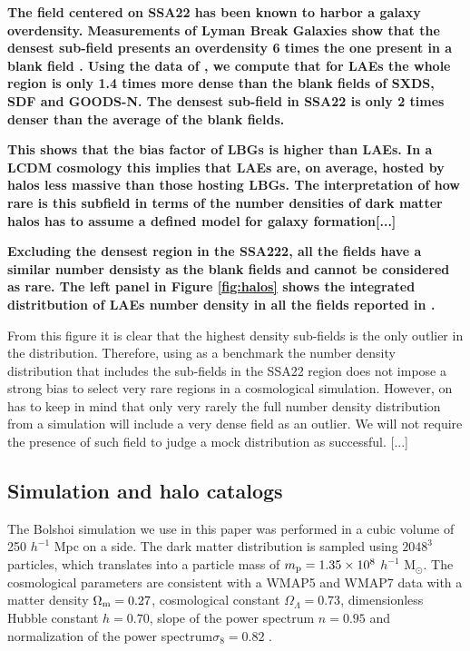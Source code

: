 \documentclass[usenatbib]{mn2e}
\begin{document}
{\bf The field centered on SSA22 has been known to harbor a 
  galaxy overdensity. Measurements of Lyman Break Galaxies show that
  the densest sub-field presents an overdensity 6 times the one present in a
  blank field \cite{XXX}. Using the data of \cite{Yamada2012}, we
  compute that for LAEs the whole region is only 1.4 times more dense than
  the blank fields of SXDS, SDF and GOODS-N. The densest sub-field
  in SSA22 is only 2 times denser than the average of the blank
  fields.}

{\bf This shows that the bias factor of LBGs is higher
  than LAEs. In a LCDM cosmology this implies that LAEs are, on average,
  hosted by halos less massive than those hosting LBGs. The
  interpretation of how rare is this subfield in terms of the number
  densities of dark matter halos has to assume a defined model for
  galaxy formation[...]} 



{\bf Excluding the densest region in the SSA222, all the fields have a
similar number densisty as the blank fields and cannot be considered
as rare. The left panel in Figure \ref{fig:halos} shows the integrated
distritbution of LAEs number density in all the fields reported in
\cite{Yamada2012}. 


From this figure it is clear that the highest density
sub-fields is the only outlier in the distribution. Therefore, using
as a benchmark the number density distribution that includes the
sub-fields in the SSA22 region does not impose a strong bias to select
very rare regions in a cosmological simulation. However, on has to
keep in mind that only very rarely the full number density distribution from a
simulation will include a very dense field as an outlier. We will not
require the presence of such field to judge a mock distribution as
successful. [...]} 


\subsection{Simulation and halo catalogs}

The Bolshoi simulation \citep{Bolshoi} we use in this paper was
performed in a cubic volume of 250 $h^{-1}$ Mpc on a side. The
dark matter distribution is sampled using $2048^{3}$ particles, which
translates into a particle mass of $m_{\rm   p}=1.35\times 10^{8}$
$h^{-1}$ M$_{\odot}$.  The cosmological parameters are consistent with
a WMAP5 and WMAP7 data with a matter density $\Omega_{\rm m} = 0.27$,
cosmological constant $\Omega_{\Lambda}=0.73$, dimensionless Hubble constant
$h=0.70$, slope of the power spectrum $n=0.95$ and normalization of the
power spectrum$\sigma_{8}=0.82$ \citep{Komatsu2009,Jarosik2011}.  
\end{document}
